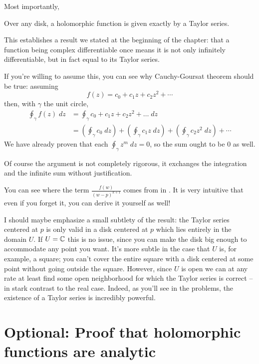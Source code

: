 Most importantly,
\begin{moral}
	Over any disk,
	a holomorphic function is given
	exactly by a Taylor series.
\end{moral}
This establishes a result we stated at the beginning of the chapter:
that a function being complex differentiable once means it is not only infinitely differentiable,
but in fact equal to its Taylor series.

\begin{remark}
	If you're willing to assume this, you can see why Cauchy-Goursat theorem should be true:
	assuming
	\[
		f(z) = c_0 + c_1 z + c_2 z^2 + \cdots
	\]
	then, with $\gamma$ the unit circle,
	\begin{align*}
		\oint_\gamma f(z) \; dz
		&= \oint_\gamma c_0 + c_1 z + c_2 z^2 + \dots \; dz \\
		&= \left( \oint_\gamma c_0 \; dz \right) +
		\left( \oint_\gamma c_1 z \; dz \right) +
		\left( \oint_\gamma c_2 z^2 \; dz \right) + \cdots
	\end{align*}
	We have already proven that each $\oint_\gamma z^m \; dz = 0$, so the sum ought to be $0$ as
	well.

	Of course the argument is not completely rigorous, it exchanges the integration and the
	infinite sum without justification.
\end{remark}

\begin{remark}
	You can see where the term $\frac{f(w)}{(w-p)^{k+1}}$ comes from in
	. It is very intuitive that even if you forget it,
	you can derive it yourself as well!
\end{remark}

I should maybe emphasize a small subtlety of the result:
the Taylor series centered at $p$ is only valid in a disk centered at $p$ which lies entirely in the domain $U$.
If $U = \mathbb C$ this is no issue, since you can make the disk big enough to accommodate any point you want.
It's more subtle in the case that $U$ is, for example, a square; you can't cover the entire square
with a disk centered at some point without going outside the square.
However, since $U$ is open we can at any rate at least find some
open neighborhood for which the Taylor
series is correct -- in stark contrast to the real case.
Indeed, as you'll see in the problems,
the existence of a Taylor series is incredibly powerful.

\section{Optional: Proof that holomorphic functions are analytic}

